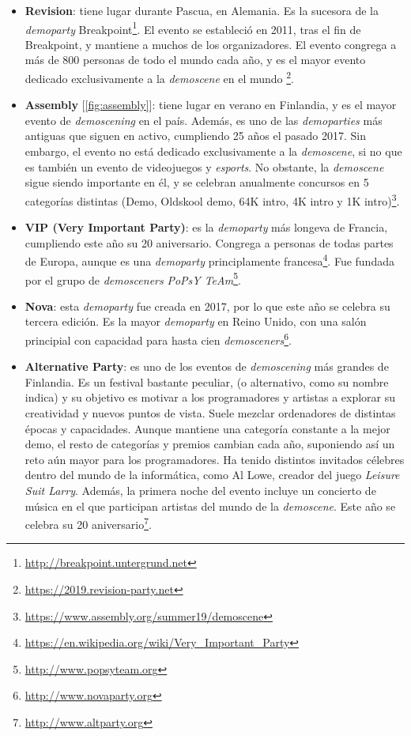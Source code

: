 \begin{itemize}
	\item \textbf{Revision}: tiene lugar durante Pascua, en Alemania. Es la sucesora de la \emph{demoparty} Breakpoint\footnote{\url{http://breakpoint.untergrund.net}}. El evento se estableció en 2011, tras el fin de Breakpoint, y mantiene a muchos de los organizadores. El evento congrega a más de 800 personas de todo el mundo cada año, y es el mayor evento dedicado exclusivamente a la \emph{demoscene} en el mundo \footnote{\url{https://2019.revision-party.net}}.
	\item \textbf{Assembly} [\ref{fig:assembly}]: tiene lugar en verano en Finlandia, y es el mayor evento de \emph{demoscening} en el país. Además, es uno de las \emph{demoparties} más antiguas que siguen en activo, cumpliendo 25 años el pasado 2017. Sin embargo, el evento no está dedicado exclusivamente a la \emph{demoscene}, si no que es también un evento de videojuegos y \emph{esports}. No obstante, la \emph{demoscene} sigue siendo importante en él, y se celebran anualmente concursos en 5 categorías distintas (Demo, Oldskool demo, 64K intro, 4K intro y 1K intro)\footnote{\url{https://www.assembly.org/summer19/demoscene}}.
	\item \textbf{VIP (Very Important Party)}: es la \emph{demoparty} más longeva de Francia, cumpliendo este año su 20 aniversario. Congrega a personas de todas partes de Europa, aunque es una \emph{demoparty} principlamente francesa\footnote{\url{https://en.wikipedia.org/wiki/Very_Important_Party}}. Fue fundada por el grupo de \emph{demosceners} \emph{PoPsY TeAm}\footnote{\url{http://www.popsyteam.org}}.
	\item \textbf{Nova}: esta \emph{demoparty} fue creada en 2017, por lo que este año se celebra su tercera edición. Es la mayor \emph{demoparty} en Reino Unido, con una salón principial con capacidad para hasta cien \emph{demosceners}\footnote{\url{http://www.novaparty.org}}.
	\item  \textbf{Alternative Party}: es uno de los eventos de \emph{demoscening} más grandes de Finlandia. Es un festival bastante peculiar, (o alternativo, como su nombre indica) y su objetivo es motivar a los programadores y artistas a explorar su creatividad y nuevos puntos de vista. Suele mezclar ordenadores de distintas épocas y capacidades. Aunque mantiene una categoría constante a la mejor demo, el resto de categorías y premios cambian cada año, suponiendo así un reto aún mayor para los programadores. Ha tenido distintos invitados célebres dentro del mundo de la informática, como Al Lowe, creador del juego \emph{Leisure Suit Larry}. Además, la primera noche del evento incluye un concierto de música en el que participan artistas del mundo de la \emph{demoscene}. Este año se celebra su 20 aniversario\footnote{\url{http://www.altparty.org}}. 

\end{itemize}
